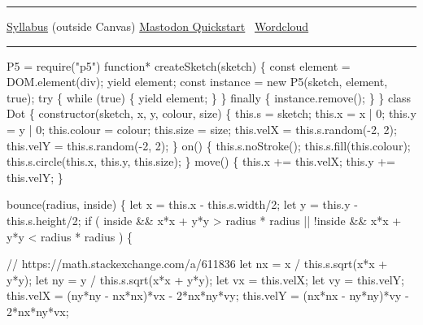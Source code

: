 \documentclass[
  letterpaper,
  DIV=11,
  numbers=noendperiod]{scrartcl}
\newenvironment{Shaded}{\begin{snugshade}}{\end{snugshade}}
\newcommand{\NormalTok}[1]{\textcolor[rgb]{0.00,0.23,0.31}{#1}}
\begin{document}
\begin{center}\rule{0.5\linewidth}{0.5pt}\end{center}

\href{https://mroberts.emerson.build/courses/vm-303-01/sp23/}{Syllabus}
(outside Canvas) \textbar{}
\href{https://canvas.emerson.edu/courses/1932613/pages/mastodon-quickstart}{Mastodon
Quickstart}
\textbar~\href{https://mroberts1.github.io/wordcloud}{Wordcloud}

\begin{center}\rule{0.5\linewidth}{0.5pt}\end{center}

\begin{Shaded}
\begin{Highlighting}[]
\NormalTok{P5 = require("p5")}
\NormalTok{function* createSketch(sketch) \{}
\NormalTok{  const element = DOM.element(\textquotesingle{}div\textquotesingle{});}
\NormalTok{  yield element;}
\NormalTok{  const instance = new P5(sketch, element, true);}
\NormalTok{  try \{}
\NormalTok{    while (true) \{}
\NormalTok{      yield element;}
\NormalTok{    \}}
\NormalTok{  \} finally \{}
\NormalTok{    instance.remove();}
\NormalTok{  \}}
\NormalTok{\}}
\NormalTok{class Dot \{}
\NormalTok{  constructor(sketch, x, y, colour, size) \{}
\NormalTok{    this.s = sketch;}
\NormalTok{    this.x = x | 0;}
\NormalTok{    this.y = y | 0;}
\NormalTok{    this.colour = colour;}
\NormalTok{    this.size = size;}
\NormalTok{    this.velX = this.s.random({-}2, 2);}
\NormalTok{    this.velY = this.s.random({-}2, 2);}
\NormalTok{  \}}
\NormalTok{  on() \{}
\NormalTok{    this.s.noStroke();}
\NormalTok{    this.s.fill(this.colour);}
\NormalTok{    this.s.circle(this.x, this.y, this.size);}
\NormalTok{  \}}
\NormalTok{  move() \{}
\NormalTok{    this.x += this.velX;}
\NormalTok{    this.y += this.velY;}
\NormalTok{  \}}
  
\NormalTok{  bounce(radius, inside) \{}
\NormalTok{    let x = this.x {-} this.s.width/2;}
\NormalTok{    let y = this.y {-} this.s.height/2;}
\NormalTok{    if (}
\NormalTok{      inside \&\& x*x + y*y \textgreater{} radius * radius ||}
\NormalTok{      !inside \&\& x*x + y*y \textless{} radius * radius}
\NormalTok{    ) \{}
    
\NormalTok{      // https://math.stackexchange.com/a/611836}
\NormalTok{      let nx = x / this.s.sqrt(x*x + y*y);}
\NormalTok{      let ny = y / this.s.sqrt(x*x + y*y);}
\NormalTok{      let vx = this.velX;}
\NormalTok{      let vy = this.velY;}
\NormalTok{      this.velX = (ny*ny {-} nx*nx)*vx {-} 2*nx*ny*vy;}
\NormalTok{      this.velY = (nx*nx {-} ny*ny)*vy {-} 2*nx*ny*vx;}
    

\end{Highlighting}
\end{Shaded}
\end{document}

